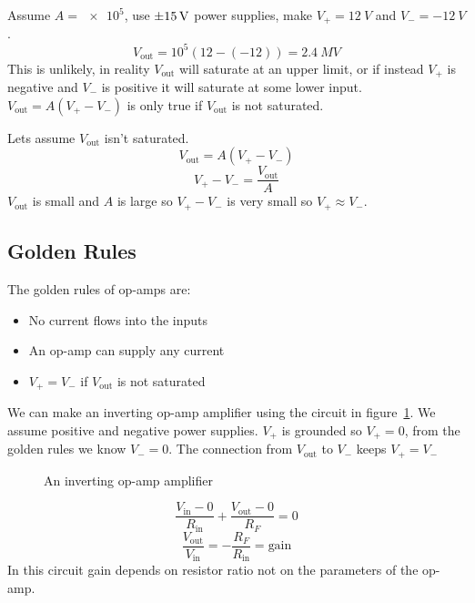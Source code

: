 \documentclass{article}
\begin{document}
    Assume \(A=\num{e5}\), use \(\SI{\pm 15}{V}\) power supplies, make \(V_+=\SI{12}{V}\) and \(V_-=\SI{-12}{V}\).
    \[V_\text{out} = 10^5(12-(-12))=\SI{2.4}{MV}\]
    This is unlikely, in reality \(V_\text{out}\) will saturate at an upper limit, or if instead \(V_+\) is negative and \(V_-\) is positive it will saturate at some lower input. \(V_\text{out}=A(V_+-V_-)\) is only true if \(V_\text{out}\) is not saturated.
    
    Lets assume \(V_\text{out}\) isn't saturated.
    \[V_\text{out} = A(V_+-V_-)\]
    \[V_+-V_-=\frac{V_\text{out}}{A}\]
    \(V_\text{out}\) is small and \(A\) is large so \(V_+-V_-\) is very small so \(V_+\approx V_-\).
    
    \subsection{Golden Rules}
    The golden rules of op-amps are:
    \begin{itemize}
        \item No current flows into the inputs
        \item An op-amp can supply any current
        \item \(V_+=V_-\) if \(V_\text{out}\) is not saturated
    \end{itemize}

    We can make an inverting op-amp amplifier using the circuit in figure~\ref{fig:op-amp inverting amplifier}. 
    We assume positive and negative power supplies. 
    \(V_+\) is grounded so \(V_+=0\), from the golden rules we know \(V_-=0\).
    The connection from \(V_\text{out}\) to \(V_-\) keeps \(V_+=V_-\)
    
    \begin{figure}[ht]
        \centering
        \caption{An inverting op-amp amplifier}
        \label{fig:op-amp inverting amplifier}
    \end{figure}
    \[\frac{V_\text{in}-0}{R_\text{in}} + \frac{V_\text{out}-0}{R_F}=0\]
    \[\frac{V_\text{out}}{V_\text{in}} = -\frac{R_F}{R_\text{in}}=\text{gain}\]
    In this circuit gain depends on resistor ratio not on the parameters of the op-amp.
    
\end{document}
